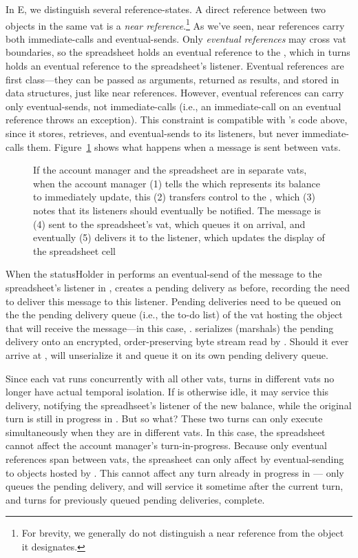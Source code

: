 \documentclass{llncs}
\begin{document}
In E, we distinguish several reference-states. A direct reference
between two objects in the same vat is a \emph{near
reference}.\footnote{
%
For brevity, we generally do not distinguish a near reference from the
object it designates.}
%
As we've seen, near references carry both immediate-calls and
eventual-sends. Only \emph{eventual references} may cross vat
boundaries, so the spreadsheet holds an eventual reference to the
, which in turns holds an eventual reference to the
spreadsheet's listener. Eventual references are first class---they can
be passed as arguments, returned as results, and stored in data
structures, just like near references. However, eventual references
can carry only eventual-sends, not immediate-calls (i.e., an
immediate-call on an eventual reference throws an exception). This
constraint is compatible with 's code above, since
it stores, retrieves, and eventual-sends to its listeners, but never
immediate-calls them.  Figure~\ref{fig:2vat} shows what happens when a
message is sent between vats.

\begin{figure}
\centerline{}
\caption{If the account manager and the spreadsheet are in separate
  vats, when the account manager (1) tells the 
  which represents its balance to immediately update, this (2)
  transfers control to the , which (3) notes that
  its listeners should eventually be notified. The message is (4) sent
  to the spreadsheet's vat, which queues it on arrival, and eventually
  (5) delivers it to the listener, which updates the display of the
  spreadsheet cell}
\label{fig:2vat}
\end{figure}

When the statusHolder in  performs an eventual-send of the
 message to the spreadsheet's listener in ,
 creates a pending delivery as before, recording the need to
deliver this message to this listener. Pending deliveries need to be
queued on the the pending delivery queue (i.e., the to-do list) of the
vat hosting the object that will receive the message---in this case,
.  serializes (marshals) the pending delivery onto an
encrypted, order-preserving byte stream read by . Should it
ever arrive at ,  will unserialize it and queue it on
its own pending delivery queue.

Since each vat runs concurrently with all other vats, turns in
different vats no longer have actual temporal isolation. If  is
otherwise idle, it may service this delivery, notifying the
spreadhseet's listener of the new balance, while the original turn is
still in progress in . But so what? These two turns can only
execute simultaneously when they are in different vats. In this case,
the spreadsheet cannot affect the account manager's
turn-in-progress. Because only eventual references span between vats,
the spreasheet can only affect  by eventual-sending to objects
hosted by . This cannot affect any turn already in progress in
--- only queues the pending delivery, and will service
it sometime after the current turn, and turns for previously queued
pending deliveries, complete.
\end{document}

